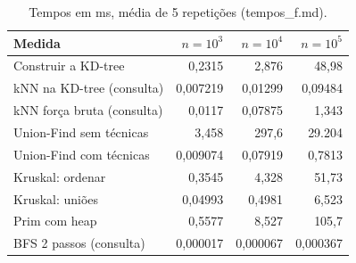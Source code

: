 \begin{table}[t]
\centering
\caption{Tempos em ms, média de 5 repetições (tempos\_f.md).}
\label{tab:tempos}
\footnotesize
\begin{tabular}{lrrr}
\toprule
Medida & $n=10^3$ & $n=10^4$ & $n=10^5$ \\
\midrule
Construir a KD-tree & 0,2315 & 2,876 & 48,98 \\
kNN na KD-tree (consulta) & 0,007219 & 0,01299 & 0,09484 \\
kNN força bruta (consulta) & 0,0117 & 0,07875 & 1,343 \\
Union-Find sem técnicas & 3,458 & 297,6 & 29.204 \\
Union-Find com técnicas & 0,009074 & 0,07919 & 0,7813 \\
Kruskal: ordenar & 0,3545 & 4,328 & 51,73 \\
Kruskal: uniões & 0,04993 & 0,4981 & 6,523 \\
Prim com heap & 0,5577 & 8,527 & 105,7 \\
BFS 2 passos (consulta) & 0,000017 & 0,000067 & 0,000367 \\
\bottomrule
\end{tabular}
\end{table}
